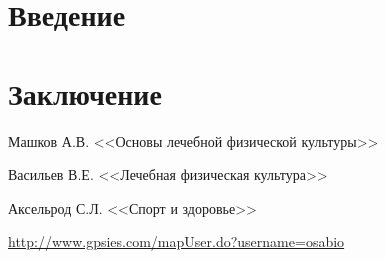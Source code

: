 \documentclass[a4paper,14pt]{extreport}
\begin{document}

\addtocounter{page}{1}

\tableofcontents

\chapter*{Введение}

\chapter*{Заключение}


\begin{thebibliography}{99}

 Машков А.В. <<Основы лечебной физической культуры>>

 Васильев В.Е. <<Лечебная физическая культура>>

 Аксельрод С.Л.  <<Спорт и здоровье>>

 \href{http://www.gpsies.com/mapUser.do?username=osabio}{http://www.gpsies.com/mapUser.do?username=osabio}

\end{thebibliography}
\end{document}
